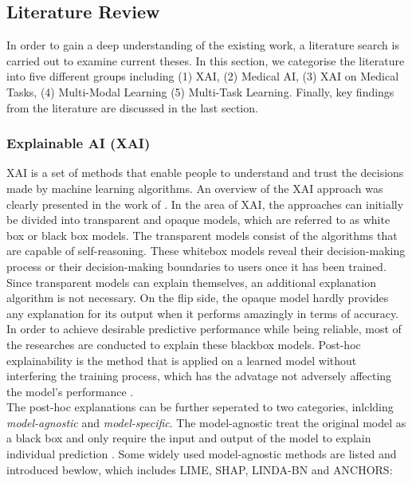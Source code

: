 
\subsection{Literature Review}

In order to gain a deep understanding of the existing work, a literature search is carried out to examine current theses. In this section, we categorise the literature into five different groups including (1) XAI, (2) Medical AI, (3) XAI on Medical Tasks, (4) Multi-Modal Learning (5) Multi-Task Learning. Finally, key findings from the literature are discussed in the last section.

\subsubsection{Explainable AI (XAI)}

XAI is a set of methods that enable people to understand and trust the decisions made by machine learning algorithms. An overview of the XAI approach was clearly presented in the work of \citet{Belle2020XAIPriciples}. In the area of ​XAI, the approaches can initially be divided into transparent and opaque models, which are referred to as white box or black box models. The transparent models consist of the algorithms that are capable of self-reasoning. These whitebox models reveal their decision-making process or their decision-making boundaries to users once it has been trained. Since transparent models can explain themselves, an additional explanation algorithm is not necessary. On the flip side, the opaque model hardly provides any explanation for its output when it performs amazingly in terms of accuracy. In order to achieve desirable predictive performance while being reliable, most of the researches are conducted to explain these blackbox models. Post-hoc explainability is the method that is applied on a learned model without interfering the training process, which has the advatage not adversely affecting the model's performance \citep{Karlo2018XAISurvey} \citep{Belle2020XAIPriciples}. \\

The post-hoc explanations can be further seperated to two categories, inlclding \textit{model-agnostic} and \textit{model-specific}. The model-agnostic treat the original model as a black box and only require the input and output of the model to explain individual prediction \citep{Ribeiro2016Modelagnostic} \citep{Karlo2018XAISurvey} \citep{Ribeiro2018Anchors}. Some widely used model-agnostic methods are listed and introduced bewlow, which includes LIME\citep{Ribeiro2016LIME}, SHAP\citep{Lundberg2017SHAP}, LINDA-BN\citep{Moreira2021LINDA} and ANCHORS\citep{Ribeiro2018Anchors}:

